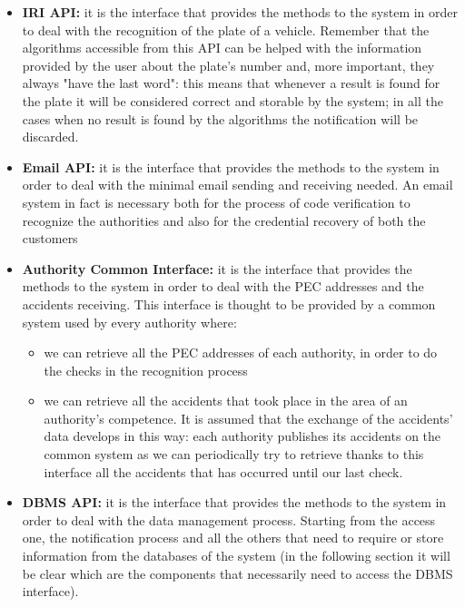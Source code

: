 \begin{itemize}
			\item \textbf{IRI API:} it is the interface that provides the methods to the system in order to deal with the recognition of the plate of a vehicle. Remember that the algorithms accessible from this API can be helped with the information provided by the user about the plate's number and, more important, they always "have the last word": this means that whenever a result is found for the plate it will be considered correct and storable by the system; in all the cases when no result is found by the algorithms the notification will be discarded.
			
			\item \textbf{Email API:} it is the interface that provides the methods to the system in order to deal with the minimal email sending and receiving needed. An email system in fact is necessary both for the process of code verification to recognize the authorities and also for the credential recovery of both the customers
			
			\item \textbf{Authority Common Interface:} it is the interface that provides the methods to the system in order to deal with the PEC addresses and the accidents receiving. This interface is thought to be provided by a common system used by every authority where:
			
			\begin{itemize}
				\item we can retrieve all the PEC addresses of each authority, in order to do the checks in the recognition process
				\item we can retrieve all the accidents that took place in the area of an authority's competence. It is assumed that the exchange of the accidents' data develops in this way: each authority publishes its accidents on the common system as we can periodically try to retrieve thanks to this interface all the accidents that has occurred until our last check.
			\end{itemize}
		
			\item \textbf{DBMS API:} it is the interface that provides the methods to the system in order to deal with the data management process. Starting from the access one, the notification process and all the others that need to require or store information from the databases of the system (in the following section it will be clear which are the components that necessarily need to access the DBMS interface).
			 
		\end{itemize}
	
